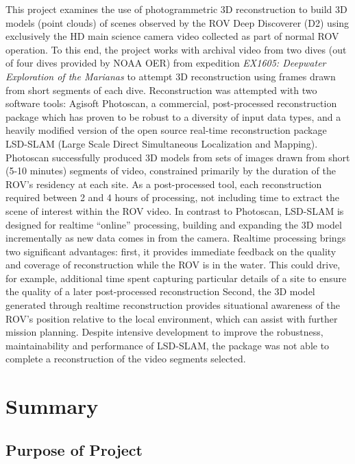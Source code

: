 \documentclass[letterpaper,12pt]{article}
\begin{document}
This project examines the use of photogrammetric 3D reconstruction to build 3D models (point clouds) of scenes observed by the ROV Deep Discoverer (D2) using exclusively the HD main science camera video collected as part of normal ROV operation.   To this end, the project works with archival video from two dives (out of four dives provided by NOAA OER) from expedition \textit{EX1605: Deepwater Exploration of the Marianas} to attempt 3D reconstruction using frames drawn from short segments of each dive.   Reconstruction was attempted with two software tools: Agisoft Photoscan, a commercial, post-processed reconstruction package which has proven to be robust to a diversity of input data types, and a heavily modified version of the open source real-time reconstruction package LSD-SLAM (Large Scale Direct Simultaneous Localization and Mapping).   Photoscan successfully produced 3D models from sets of images drawn from short (5-10 minutes) segments of video, constrained primarily by the duration of the ROV's residency at each site.    As a post-processed tool, each reconstruction required between 2 and 4 hours of processing, not including time to extract the scene of interest within the ROV video.  In contrast to Photoscan, LSD-SLAM is designed for realtime ``online'' processing, building and expanding the 3D model incrementally as new data comes in from the camera.    Realtime processing brings two significant advantages:   first, it provides immediate feedback on the quality and coverage of reconstruction while the ROV is in the water.   This could drive, for example, additional time spent capturing particular details of a site to ensure the quality of a later post-processed reconstruction   Second, the 3D model generated through realtime reconstruction provides situational awareness of the ROV's position relative to the local environment, which can assist with further mission planning.    Despite intensive development to improve the robustness, maintainability and performance of LSD-SLAM, the package was not able to complete a reconstruction of the video segments selected. 

\section{Summary}

\subsection{Purpose of Project}
\end{document}
